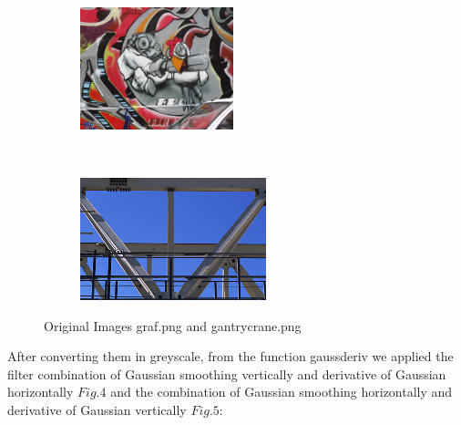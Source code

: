 \documentclass[
	12pt, %
]{fphw}
\begin{document}
\begin{figure}[h!]
    \centering
    \begin{subfigure}[t]{0.5\textwidth}
        \centering
        \includegraphics[height=1.4in]{img/1e/graf.png}

    \end{subfigure}%
    ~ 
    \begin{subfigure}[t]{0.4\textwidth}
        \centering
        \includegraphics[height=1.4in]{img/1e/gantrycrane.png}

	\end{subfigure}
	\caption{Original Images graf.png and gantrycrane.png}
\end{figure}


After converting them in greyscale, from the function gaussderiv we applied the filter combination of Gaussian smoothing vertically and derivative of Gaussian horizontally \(Fig. 4\) and the combination of Gaussian smoothing horizontally and derivative of Gaussian vertically \(Fig. 5\):
\end{document}
